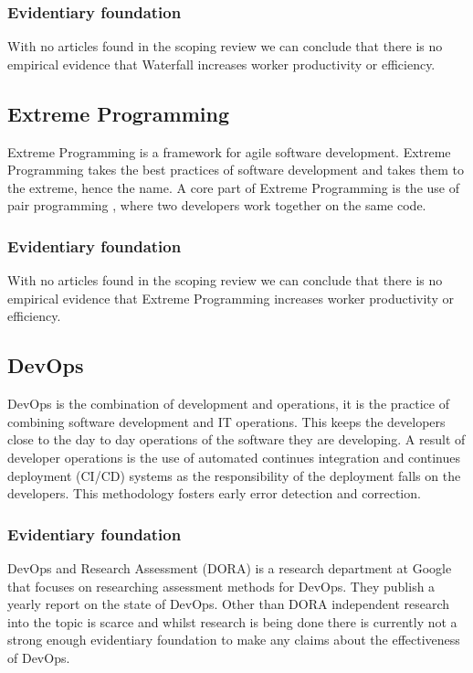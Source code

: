 \documentclass[12pt]{article}
\begin{document}
\subsubsection{Evidentiary foundation}
With no articles found in the scoping review we can conclude that there is no empirical evidence that Waterfall increases worker productivity or efficiency.

\subsection{Extreme Programming}
Extreme Programming \cite{ExtremeProgramming2025} is a framework for agile software development. Extreme Programming takes 
the best practices of software development and takes them to the extreme, hence the name. A core part of Extreme Programming is the use of
pair programming \cite{PairProgramming2024}, where two developers work together on the same code.

\subsubsection{Evidentiary foundation}
With no articles found in the scoping review we can conclude that there is no empirical evidence that Extreme Programming increases worker productivity or efficiency.

\subsection{DevOps}
DevOps is the combination of development and operations, it is the practice of combining software development and IT operations.
This keeps the developers close to the day to day operations of the software they are developing. A result of developer operations is 
the use of automated continues integration and continues deployment (CI/CD) \cite{ContinuousDelivery2025} systems as the responsibility 
of the deployment falls on the developers. This methodology fosters early error detection and correction.

\subsubsection{Evidentiary foundation}
DevOps and Research Assessment (DORA) \cite{DORAGetBetter} is a research department at Google that focuses on 
researching assessment methods for DevOps. They publish a yearly report on the state of DevOps. Other than DORA independent research
into the topic is scarce and whilst research is being done there is currently not a strong enough evidentiary foundation to make 
any claims about the effectiveness of DevOps.
\end{document}
